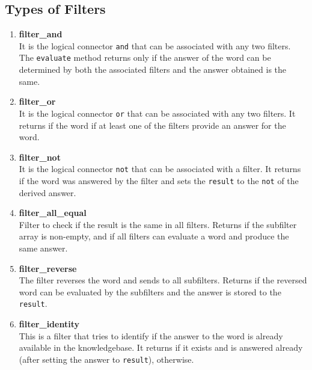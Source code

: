 \subsection{Types of Filters}
\begin{enumerate}
 
\item \textbf{filter\_and} \\
It is the logical connector \texttt{and} that can be associated with any two filters. The \texttt{evaluate} method returns \true only if the answer of the word can be determined by both the associated filters and the answer obtained is the same.

\item \textbf{filter\_or}  \\
It is the logical connector \texttt{or} that can be associated with any two filters. It returns \true if the word if at least one of the filters provide an answer for the word.

\item \textbf{filter\_not} \\
It is the logical connector \texttt{not} that can be associated with a filter. It returns \true if the word was answered by the filter and sets the \texttt{result} to the \texttt{not} of the derived answer.

\item \textbf{filter\_all\_equal} \\
Filter to check if the result is the same in all filters. Returns \true if the subfilter array is non-empty, and if all filters can evaluate a word and produce the same answer. 

\item \textbf{filter\_reverse} \\
The filter reverses the word and sends to all subfilters. Returns \true if the reversed word can be evaluated by the subfilters and the answer is stored to the \texttt{result}.

\item \textbf{filter\_identity} \\
This is a filter that tries to identify if the answer to the word is already available in the knowledgebase. It returns \true if it exists and is answered already (after setting the answer to \texttt{result}), \false otherwise.

\end{enumerate}


